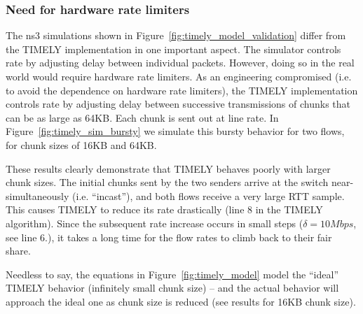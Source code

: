 \subsubsection{Need for hardware rate limiters}

The ns3 simulations shown in Figure~\ref{fig:timely_model_validation} differ
from the TIMELY implementation in one important aspect. The simulator controls
rate by adjusting delay between individual packets. However, doing so in the
real world would require hardware rate limiters. As an engineering compromised
(i.e. to avoid the dependence on hardware rate limiters), the TIMELY
implementation controls rate by adjusting delay between successive transmissions
of chunks that can be as large as 64KB. Each chunk is sent out at line rate.  In
Figure~\ref{fig:timely_sim_bursty} we simulate this bursty behavior for two
flows, for chunk sizes of 16KB and 64KB.

These results clearly demonstrate that TIMELY behaves poorly with larger chunk
sizes. The initial chunks sent by the two senders arrive at the switch
near-simultaneously (i.e. ``incast''), and both flows receive a very large RTT
sample. This causes TIMELY to reduce its rate drastically (line 8 in the TIMELY
algorithm). Since the subsequent rate increase occurs in small steps ($\delta =
10Mbps$, see line 6.), it takes a long time for the flow rates to climb back to
their fair share.

Needless to say, the equations in Figure~\ref{fig:timely_model} model the
``ideal'' TIMELY behavior (infinitely small chunk size) -- and the actual
behavior will approach the ideal one as chunk size is reduced (see results for
16KB chunk size).


